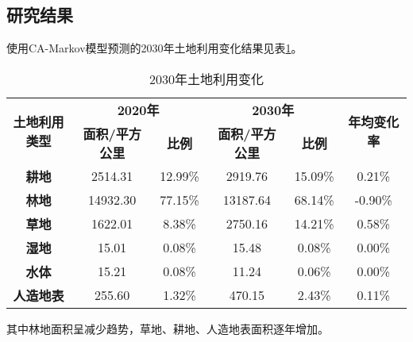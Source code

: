 \documentclass[10pt,aspectratio=169]{beamer} %
\begin{document}
	\subsection{研究结果}
	\begin{frame}[c]{\secname}{\subsecname}
		使用CA-Markov模型预测的2030年土地利用变化结果见表\ref{Table.3}。
		\begin{table}[htbp]
			\centering
			\caption{2030年土地利用变化}
			\begin{tabular}{cccccc}
				\toprule
				\multirow{2}[4]{*}{\textbf{土地利用类型}} &
				\multicolumn{2}{c}{\textbf{2020年}} |&
				\multicolumn{2}{c}{\textbf{2030年}} &
				\multirow{2}[4]{*}{\textbf{年均变化率}}
				\\
				\cmidrule{2-5}     &
				\textbf{面积/平方公里} &
				\textbf{比例} &
				\textbf{面积/平方公里} &
				\textbf{比例} &
				
				\\
				\midrule
				\textbf{耕地} &
				2514.31 &
				12.99\% &
				2919.76 &
				15.09\% &
				0.21\%
				\\
				\textbf{林地} &
				14932.30 &
				77.15\% &
				13187.64 &
				68.14\% &
				-0.90\%
				\\
				\textbf{草地} &
				1622.01 &
				8.38\% &
				2750.16 &
				14.21\% &
				0.58\%
				\\
				\textbf{湿地} &
				15.01 &
				0.08\% &
				15.48 &
				0.08\% &
				0.00\%
				\\
				\textbf{水体} &
				15.21 &
				0.08\% &
				11.24 &
				0.06\% &
				0.00\%
				\\
				\textbf{人造地表} &
				255.60 &
				1.32\% &
				470.15 &
				2.43\% &
				0.11\%
				\\
				\bottomrule
			\end{tabular}%
			\label{Table.3}%
		\end{table}%
		其中林地面积呈减少趋势，草地、耕地、人造地表面积逐年增加。		
	\end{frame}
\end{document}

